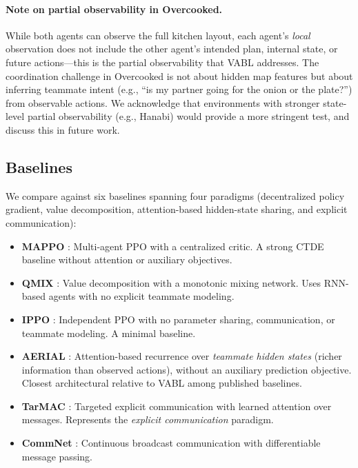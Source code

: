 \documentclass{article}
\theoremstyle{plain}
\theoremstyle{definition}
\theoremstyle{remark}
\begin{document}
\paragraph{Note on partial observability in Overcooked.} While both agents can observe the full kitchen layout, each agent's \emph{local} observation does not include the other agent's intended plan, internal state, or future actions---this is the partial observability that VABL addresses. The coordination challenge in Overcooked is not about hidden map features but about inferring teammate intent (e.g., ``is my partner going for the onion or the plate?'') from observable actions. We acknowledge that environments with stronger state-level partial observability (e.g., Hanabi) would provide a more stringent test, and discuss this in future work.

\subsection{Baselines}
We compare against six baselines spanning four paradigms (decentralized policy gradient, value decomposition, attention-based hidden-state sharing, and explicit communication):

\begin{itemize}
\item \textbf{MAPPO} \cite{yu2022surprising}: Multi-agent PPO with a centralized critic. A strong CTDE baseline without attention or auxiliary objectives.
\item \textbf{QMIX} \cite{rashid2020monotonic}: Value decomposition with a monotonic mixing network. Uses RNN-based agents with no explicit teammate modeling.
\item \textbf{IPPO} \cite{dewitt2020independentlearningneedstarcraft}: Independent PPO with no parameter sharing, communication, or teammate modeling. A minimal baseline.
\item \textbf{AERIAL} \cite{phan2023attention}: Attention-based recurrence over \emph{teammate hidden states} (richer information than observed actions), without an auxiliary prediction objective. Closest architectural relative to VABL among published baselines.
\item \textbf{TarMAC} \cite{das2019tarmac}: Targeted explicit communication with learned attention over messages. Represents the \emph{explicit communication} paradigm.
\item \textbf{CommNet} \cite{sukhbaatar2016commnet}: Continuous broadcast communication with differentiable message passing.
\end{itemize}
\end{document}
